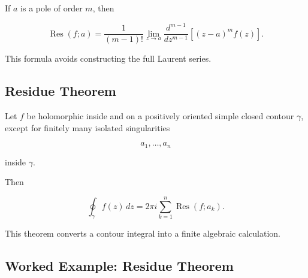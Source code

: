 If \(a\) is a pole of order \(m\), then

\[
\boxed{
\operatorname{Res}(f;a)
=
\frac{1}{(m-1)!}
\lim_{z\to a}
\frac{d^{m-1}}{dz^{m-1}}
\left[
(z-a)^m f(z)
\right].
}
\]

This formula avoids constructing the full Laurent series.

\subsection{Residue Theorem}
\label{subsec:residue-theorem}

\begin{theorem}
Let \(f\) be holomorphic inside and on a positively oriented simple closed
contour \(\gamma\), except for finitely many isolated singularities

\[
a_1,\ldots,a_n
\]

inside \(\gamma\).

Then

\[
\boxed{
\oint_\gamma f(z)\,dz
=
2\pi i
\sum_{k=1}^{n}
\operatorname{Res}(f;a_k).
}
\]
\end{theorem}

This theorem converts a contour integral into a finite algebraic
calculation.

\subsection{Worked Example: Residue Theorem}
\label{subsec:worked-residue-theorem}


